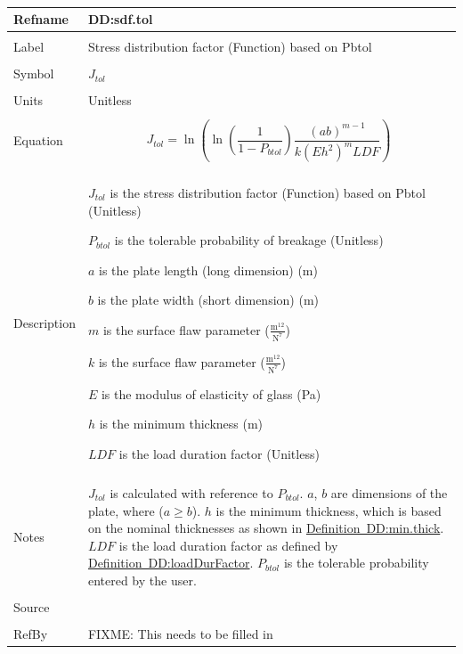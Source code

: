 \documentclass[12pt]{article}
\begin{document}
~\newline
\noindent \begin{minipage}{\textwidth}
\begin{tabular}{p{} p{}}
\toprule \textbf{Refname} & \textbf{DD:sdf.tol}
\label{DD:sdf.tol}
\\ \midrule \\
Label & Stress distribution factor (Function) based on Pbtol
\\ \midrule \\
Symbol & ${J_{tol}}$
\\ \midrule \\
Units & Unitless
\\ \midrule \\
Equation & \begin{dmath}
           {J_{tol}}=\ln\left(\ln\left(\frac{1}{1-{P_{btol}}}\right) \frac{\left(a b\right)^{m-1}}{k \left(E h^{2}\right)^{m} LDF}\right)
           \end{dmath}
\\ \midrule \\
Description & \begin{symbDescription}
              \item{${J_{tol}}$ is the stress distribution factor (Function) based on Pbtol (Unitless)}
              \item{${P_{btol}}$ is the tolerable probability of breakage (Unitless)}
              \item{$a$ is the plate length (long dimension) (m)}
              \item{$b$ is the plate width (short dimension) (m)}
              \item{$m$ is the surface flaw parameter ($\frac{\text{m}^{12}}{\text{N}^{7}}$)}
              \item{$k$ is the surface flaw parameter ($\frac{\text{m}^{12}}{\text{N}^{7}}$)}
              \item{$E$ is the modulus of elasticity of glass (Pa)}
              \item{$h$ is the minimum thickness (m)}
              \item{$LDF$ is the load duration factor (Unitless)}
              \end{symbDescription}
\\ \midrule \\
Notes & ${J_{tol}}$  is calculated with reference to  ${P_{btol}}$.
        $a$, $b$ are dimensions of the plate, where ($a\geq{}b$).
        $h$ is the minimum thickness, which is based on the nominal thicknesses as shown in \hyperref[DD:min.thick]{Definition~DD:min.thick}.
        $LDF$ is the load duration factor as defined by \hyperref[DD:loadDurFactor]{Definition~DD:loadDurFactor}.
        ${P_{btol}}$ is the tolerable probability entered by the user.
\\ \midrule \\
Source & 
\\ \midrule \\
RefBy & FIXME: This needs to be filled in
\\ \bottomrule \end{tabular}
\end{minipage}\\
\end{document}
